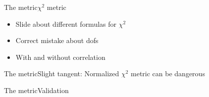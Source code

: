 \begin{frame}{The metric}{$\chi^2$ metric}
	\begin{itemize}
		\item Slide about different formulas for $\chi^2$
		\item Correct mistake about dofs
		\item With and without correlation
	\end{itemize}
\end{frame}

\begin{frame}{The metric}{Slight tangent: Normalized $\chi^2$ metric can be dangerous}
	
\end{frame}

\begin{frame}{The metric}{Validation}
	
\end{frame}

